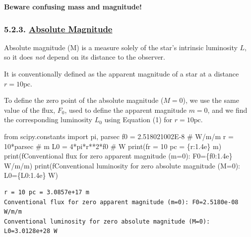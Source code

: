 \documentclass[
  letterpaper,
  DIV=11,
  numbers=noendperiod]{scrartcl}
\newenvironment{Shaded}{\begin{snugshade}}{\end{snugshade}}
\newcommand{\BuiltInTok}[1]{\textcolor[rgb]{0.00,0.23,0.31}{#1}}
\newcommand{\CommentTok}[1]{\textcolor[rgb]{0.37,0.37,0.37}{#1}}
\newcommand{\DecValTok}[1]{\textcolor[rgb]{0.68,0.00,0.00}{#1}}
\newcommand{\FloatTok}[1]{\textcolor[rgb]{0.68,0.00,0.00}{#1}}
\newcommand{\ImportTok}[1]{\textcolor[rgb]{0.00,0.46,0.62}{#1}}
\newcommand{\NormalTok}[1]{\textcolor[rgb]{0.00,0.23,0.31}{#1}}
\newcommand{\OperatorTok}[1]{\textcolor[rgb]{0.37,0.37,0.37}{#1}}
\newcommand{\SpecialCharTok}[1]{\textcolor[rgb]{0.37,0.37,0.37}{#1}}
\newcommand{\SpecialStringTok}[1]{\textcolor[rgb]{0.13,0.47,0.30}{#1}}
\begin{document}
\textbf{Beware confusing mass and magnitude!}

\hypertarget{absolute-magnitude}{%
\subsubsection{\texorpdfstring{5.2.3. \protect\hyperlink{toc0_}{Absolute
Magnitude}}{5.2.3. Absolute Magnitude}}\label{absolute-magnitude}}

Absolute magnitude (M) is a measure solely of the star's intrinsic
luminosity \(L\), so it does \emph{not} depend on its distance to the
observer.

It is conventionally defined as the apparent magnitude of a star at a
distance \(r=10\mathrm{pc}\).

To define the zero point of the absolute magnitude (\(M=0\)), we use the
same value of the flux, \(F_0\), used to define the apparent magnitude
\(m=0\), and we find the corresponding luminosity \(L_0\) using Equation
(1) for \(r=10\mathrm{pc}\).

\begin{Shaded}
\begin{Highlighting}[]
\ImportTok{from}\NormalTok{ scipy.constants }\ImportTok{import}\NormalTok{ pi, parsec}
\NormalTok{f0 }\OperatorTok{=} \FloatTok{2.518021002E{-}8} \CommentTok{\# W/m/m}
\NormalTok{r }\OperatorTok{=} \DecValTok{10}\OperatorTok{*}\NormalTok{parsec }\CommentTok{\# m}
\NormalTok{L0 }\OperatorTok{=} \DecValTok{4}\OperatorTok{*}\NormalTok{pi}\OperatorTok{*}\NormalTok{r}\OperatorTok{**}\DecValTok{2}\OperatorTok{*}\NormalTok{f0 }\CommentTok{\# W}
\BuiltInTok{print}\NormalTok{(}\SpecialStringTok{f\textquotesingle{}r = 10 pc = }\SpecialCharTok{\{}\NormalTok{r}\SpecialCharTok{:1.4e\}}\SpecialStringTok{ m\textquotesingle{}}\NormalTok{)}
\BuiltInTok{print}\NormalTok{(}\SpecialStringTok{f\textquotesingle{}Conventional flux for zero apparent magnitude (m=0): F0=}\SpecialCharTok{\{}\NormalTok{f0}\SpecialCharTok{:1.4e\}}\SpecialStringTok{ W/m/m\textquotesingle{}}\NormalTok{)}
\BuiltInTok{print}\NormalTok{(}\SpecialStringTok{f\textquotesingle{}Conventional luminosity for zero absolute magnitude (M=0): L0=}\SpecialCharTok{\{}\NormalTok{L0}\SpecialCharTok{:1.4e\}}\SpecialStringTok{ W\textquotesingle{}}\NormalTok{)}
\end{Highlighting}
\end{Shaded}

\begin{verbatim}
r = 10 pc = 3.0857e+17 m
Conventional flux for zero apparent magnitude (m=0): F0=2.5180e-08 W/m/m
Conventional luminosity for zero absolute magnitude (M=0): L0=3.0128e+28 W
\end{verbatim}
\end{document}
